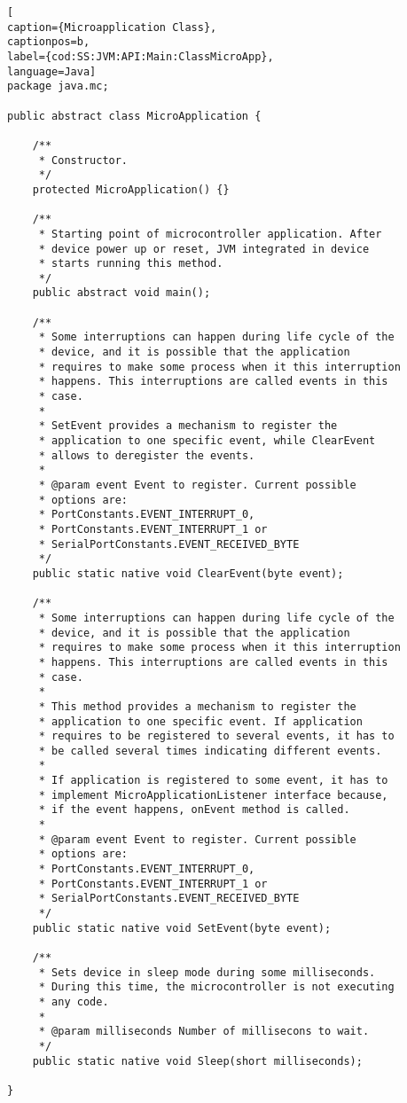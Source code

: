 \medskip
\begin{lstlisting}[
caption={Microapplication Class},
captionpos=b,
label={cod:SS:JVM:API:Main:ClassMicroApp},
language=Java]
package java.mc;

public abstract class MicroApplication {

    /**
     * Constructor.
     */
    protected MicroApplication() {}

    /**
     * Starting point of microcontroller application. After
     * device power up or reset, JVM integrated in device
     * starts running this method.
     */
    public abstract void main();

    /**
     * Some interruptions can happen during life cycle of the
     * device, and it is possible that the application
     * requires to make some process when it this interruption
     * happens. This interruptions are called events in this
     * case.
     * 
     * SetEvent provides a mechanism to register the
     * application to one specific event, while ClearEvent
     * allows to deregister the events. 
     * 
     * @param event Event to register. Current possible
     * options are:
     * PortConstants.EVENT_INTERRUPT_0,
     * PortConstants.EVENT_INTERRUPT_1 or
     * SerialPortConstants.EVENT_RECEIVED_BYTE
     */
    public static native void ClearEvent(byte event);

    /**
     * Some interruptions can happen during life cycle of the
     * device, and it is possible that the application
     * requires to make some process when it this interruption
     * happens. This interruptions are called events in this
     * case.
     * 
     * This method provides a mechanism to register the
     * application to one specific event. If application
     * requires to be registered to several events, it has to
     * be called several times indicating different events.
     * 
     * If application is registered to some event, it has to
     * implement MicroApplicationListener interface because,
     * if the event happens, onEvent method is called. 
     * 
     * @param event Event to register. Current possible
     * options are:
     * PortConstants.EVENT_INTERRUPT_0,
     * PortConstants.EVENT_INTERRUPT_1 or
     * SerialPortConstants.EVENT_RECEIVED_BYTE
     */
    public static native void SetEvent(byte event);

    /**
     * Sets device in sleep mode during some milliseconds.
     * During this time, the microcontroller is not executing
     * any code.
     *
     * @param milliseconds Number of millisecons to wait.
     */
    public static native void Sleep(short milliseconds);

}
\end{lstlisting}
\medskip

